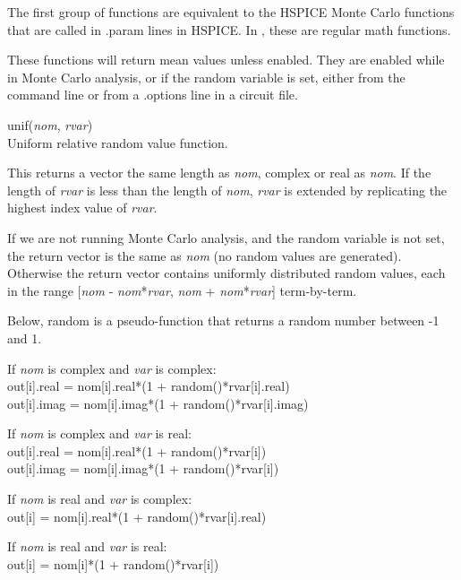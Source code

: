 The first group of functions are equivalent to the HSPICE Monte Carlo
functions that are called in {\vt .param} lines in HSPICE.  In
{\WRspice}, these are regular math functions.

These functions will return mean values unless enabled.  They are
enabled while in Monte Carlo analysis, or if the {\et random} variable
is set, either from the command line or from a {\vt .options} line in
a circuit file.

\begin{description}
\item{\vt unif}({\it nom\/}, {\it rvar\/})\\
Uniform relative random value function.

This returns a vector the same length as {\it nom}, complex or real as
{\it nom}.  If the length of {\it rvar} is less than the length of
{\it nom}, {\it rvar} is extended by replicating the highest index
value of {\it rvar}.

If we are not running Monte Carlo analysis, and the {\et random}
variable is not set, the return vector is the same as {\it nom} (no
random values are generated).  Otherwise the return vector contains
uniformly distributed random values, each in the range [{\it nom} -
{\it nom\/}*{\it rvar\/}, {\it nom} + {\it nom\/}*{\it rvar\/}]
term-by-term.

Below, {\vt random} is a pseudo-function that returns a random number
between -1 and 1.

\begin{description}
\item{If {\it nom} is complex and {\it var} is complex:}\\
  {\vt out[i].real = nom[i].real*(1 + random()*rvar[i].real)}\\
  {\vt out[i].imag = nom[i].imag*(1 + random()*rvar[i].imag)}

\item{If {\it nom} is complex and {\it var} is real:}\\
  {\vt out[i].real = nom[i].real*(1 + random()*rvar[i])}\\
  {\vt out[i].imag = nom[i].imag*(1 + random()*rvar[i])}

\item{If {\it nom} is real and {\it var} is complex:}\\
  {\vt out[i] = nom[i].real*(1 + random()*rvar[i].real)}

\item{If {\it nom} is real and {\it var} is real:}\\
  {\vt out[i] = nom[i]*(1 + random()*rvar[i])}
\end{description}


\end{description}
